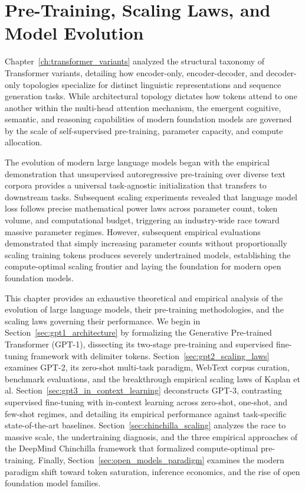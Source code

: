 \documentclass[../../../main.tex]{subfiles}
\begin{document}
\chapter{Pre-Training, Scaling Laws, and Model Evolution}
\label{ch:scaling_laws_pretraining}

Chapter~\ref{ch:transformer_variants} analyzed the structural taxonomy of Transformer variants, detailing how encoder-only, encoder-decoder, and decoder-only topologies specialize for distinct linguistic representations and sequence generation tasks. While architectural topology dictates how tokens attend to one another within the multi-head attention mechanism, the emergent cognitive, semantic, and reasoning capabilities of modern foundation models are governed by the scale of self-supervised pre-training, parameter capacity, and compute allocation.

The evolution of modern large language models began with the empirical demonstration that unsupervised autoregressive pre-training over diverse text corpora provides a universal task-agnostic initialization that transfers to downstream tasks. Subsequent scaling experiments revealed that language model loss follows precise mathematical power laws across parameter count, token volume, and computational budget, triggering an industry-wide race toward massive parameter regimes. However, subsequent empirical evaluations demonstrated that simply increasing parameter counts without proportionally scaling training tokens produces severely undertrained models, establishing the compute-optimal scaling frontier and laying the foundation for modern open foundation models.

This chapter provides an exhaustive theoretical and empirical analysis of the evolution of large language models, their pre-training methodologies, and the scaling laws governing their performance. We begin in Section~\ref{sec:gpt1_architecture} by formalizing the Generative Pre-trained Transformer (GPT-1), dissecting its two-stage pre-training and supervised fine-tuning framework with delimiter tokens. Section~\ref{sec:gpt2_scaling_laws} examines GPT-2, its zero-shot multi-task paradigm, WebText corpus curation, benchmark evaluations, and the breakthrough empirical scaling laws of Kaplan et al. Section~\ref{sec:gpt3_in_context_learning} deconstructs GPT-3, contrasting supervised fine-tuning with in-context learning across zero-shot, one-shot, and few-shot regimes, and detailing its empirical performance against task-specific state-of-the-art baselines. Section~\ref{sec:chinchilla_scaling} analyzes the race to massive scale, the undertraining diagnosis, and the three empirical approaches of the DeepMind Chinchilla framework that formalized compute-optimal pre-training. Finally, Section~\ref{sec:open_models_paradigm} examines the modern paradigm shift toward token saturation, inference economics, and the rise of open foundation model families.
\end{document}
